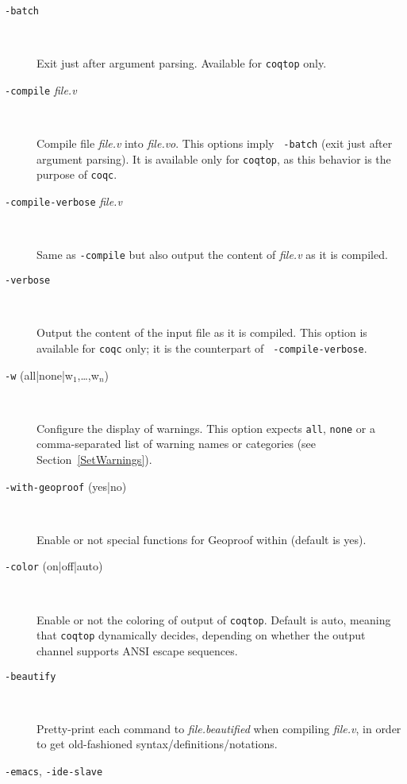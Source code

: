 \begin{description}
\item[{\tt -batch}]\ %

  Exit just after argument parsing. Available for {\tt coqtop} only.

\item[{\tt -compile} {\em file.v}]\ %

  Compile file {\em file.v} into {\em file.vo}. This options imply {\tt
    -batch} (exit just after argument parsing). It is available only
  for {\tt coqtop}, as this behavior is the purpose of {\tt coqc}.

\item[{\tt -compile-verbose} {\em file.v}]\ %

  Same as {\tt -compile} but also output the content of {\em file.v} as
  it is compiled.

\item[{\tt -verbose}]\ %

  Output the content of the input file as it is compiled. This option is
  available for {\tt coqc} only; it is the counterpart of {\tt
    -compile-verbose}.

  \item[{\tt -w} (all|none|w$_1$,\ldots,w$_n$)]\ %

  Configure the display of warnings. This option expects {\tt all}, {\tt none}
  or a comma-separated list of warning names or categories (see
  Section~\ref{SetWarnings}).

%

\item[{\tt -with-geoproof} (yes|no)]\ %

  Enable or not special functions for Geoproof within {\CoqIDE} (default
  is yes).

\item[{\tt -color} (on|off|auto)]\ %

  Enable or not the coloring of output of {\tt coqtop}. Default is auto,
  meaning that {\tt coqtop} dynamically decides, depending on whether the
  output channel supports ANSI escape sequences.

\item[{\tt -beautify}]\ %

  Pretty-print each command to {\em file.beautified} when compiling {\em
    file.v}, in order to get old-fashioned syntax/definitions/notations.

\item[{\tt -emacs}, {\tt -ide-slave}]\ %


\end{description}
